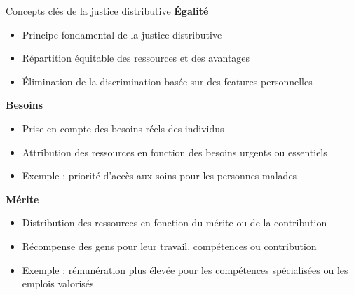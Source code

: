 \documentclass{beamer}
\begin{document}
\begin{frame}{Concepts clés de la justice distributive}
	\textbf{Égalité}
	\begin{itemize}
		\item Principe fondamental de la justice distributive
		\item Répartition équitable des ressources et des avantages
		\item Élimination de la discrimination basée sur des features personnelles
	\end{itemize}
	
	\vspace{0.3cm}
	
	\textbf{Besoins}
	\begin{itemize}
		\item Prise en compte des besoins réels des individus
		\item Attribution des ressources en fonction des besoins urgents ou essentiels
		\item Exemple : priorité d'accès aux soins pour les personnes malades
	\end{itemize}
	
	\vspace{0.3cm}
	
	\textbf{Mérite}
	\begin{itemize}
		\item Distribution des ressources en fonction du mérite ou de la contribution
		\item Récompense des gens pour leur travail, compétences ou contribution
		\item Exemple : rémunération plus élevée pour les compétences spécialisées ou les emplois valorisés
	\end{itemize}
\end{frame}
\end{document}
